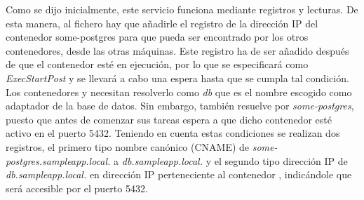 \begin{codelisting}
\label{code:user-data-skydns}
\end{codelisting}

Como se dijo inicialmente, este servicio funciona mediante registros y lecturas. De esta manera, al fichero  hay que añadirle el registro de la dirección IP del contenedor some-postgres para que pueda ser encontrado por los otros contenedores, desde las otras máquinas. Este registro ha de ser añadido después de que el contenedor esté en ejecución, por lo que se especificará como \textit{ExecStartPost} y se llevará a cabo una espera hasta que se cumpla tal condición. Los contenedores  y  necesitan resolverlo como \textit{db} que es el nombre escogido como adaptador de la base de datos. Sin embargo,  también resuelve por \textit{some-postgres}, puesto que antes de comenzar sus tareas espera a que dicho contenedor esté activo en el puerto 5432. Teniendo en cuenta estas condiciones se realizan dos registros, el primero tipo nombre canónico (CNAME) de \textit{some-postgres.sampleapp.local.} a \textit{db.sampleapp.local.} y el segundo tipo dirección IP de \textit{db.sampleapp.local.} en dirección IP perteneciente al contenedor , indicándole que será accesible por el puerto 5432.

